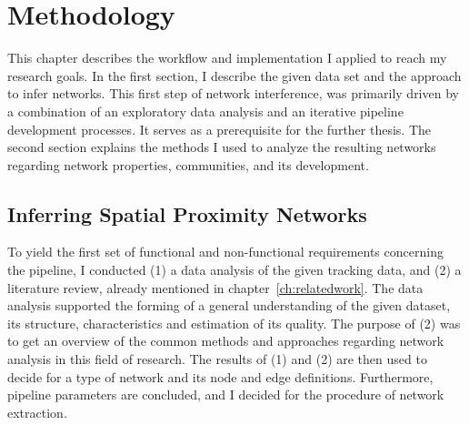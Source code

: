 \chapter{Methodology}
\label{ch:approach}

This chapter describes the workflow and implementation I applied to reach my research goals. 
In the first section, I describe the given data set and the approach to infer networks.
This first step of network interference, was primarily driven by a combination of an exploratory data analysis and an iterative pipeline development processes.
It serves as a prerequisite for the further thesis.
The second section explains the methods I used to analyze the resulting networks regarding network properties, communities, and its development.

\section{Inferring Spatial Proximity Networks}
\label{sec:infNetworks}
To yield the first set of functional and non-functional requirements concerning the pipeline, I conducted (1) a data analysis of the given tracking data, and (2) a literature review,  already mentioned in chapter~\ref{ch:relatedwork}.
The data analysis supported the forming of a general understanding of the given dataset, its structure, characteristics and estimation of its quality.
The purpose of (2) was to get an overview of the common methods and approaches regarding network analysis in this field of research.
The results of (1) and (2) are then used to decide for a type of network and its node and edge definitions.
Furthermore, pipeline parameters are concluded, and I decided for the procedure of network extraction.


